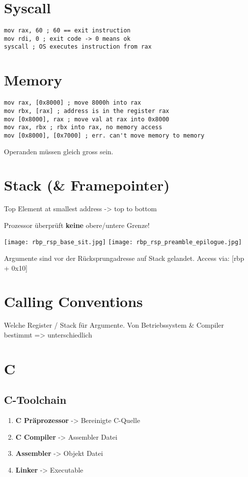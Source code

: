 \begin{multicols*}{4}
\section{Syscall}
\begin{lstlisting}[language={[x86masm]Assembler}]
mov rax, 60 ; 60 == exit instruction
mov rdi, 0 ; exit code -> 0 means ok
syscall ; OS executes instruction from rax
\end{lstlisting}

\section{Memory}
\begin{lstlisting}[language={[x86masm]Assembler}]
mov rax, [0x8000] ; move 8000h into rax
mov rbx, [rax] ; address is in the register rax
mov [0x8000], rax ; move val at rax into 0x8000
mov rax, rbx ; rbx into rax, no memory access
mov [0x8000], [0x7000] ; err. can't move memory to memory
\end{lstlisting}
Operanden müssen gleich gross sein.

\section{Stack (\& Framepointer)}
Top Element at smallest address -> top to bottom

Prozessor überprüft \textbf{keine} obere/untere Grenze!

\texttt{[image: rbp\_rsp\_base\_sit.jpg]}
\texttt{[image: rbp\_rsp\_preamble\_epilogue.jpg]}

Argumente sind vor der Rücksprungadresse auf Stack gelandet. Access via: [rbp + 0x10]

\section{Calling Conventions}
Welche Register / Stack für Argumente. Von Betriebssystem \& Compiler bestimmt => unterschiedlich

\section{C}
\subsection{C-Toolchain}
\begin{enumerate}
    \item \textbf{C Präprozessor} -> Bereinigte C-Quelle
    \item \textbf{C Compiler} -> Assembler Datei
    \item \textbf{Assembler} -> Objekt Datei
    \item \textbf{Linker} -> Executable
\end{enumerate}

\end{multicols*}
